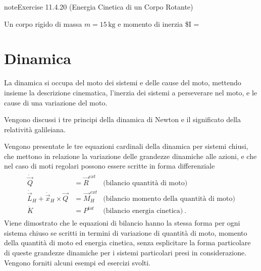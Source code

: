 \documentclass[letterpaper,10pt,italian]{jupyterBook}
\begin{document}
\begin{sphinxadmonition}{note}{Exercise 11.4.20 (Energia Cinetica di un Corpo Rotante)}



\sphinxAtStartPar
Un corpo rigido di massa \(m = 15 \, \text{kg}\) e momento di inerzia \$I =
\end{sphinxadmonition}

\sphinxstepscope




\chapter{Dinamica}
\label{\detokenize{ch/mechanics/dynamics:dinamica}}\label{\detokenize{ch/mechanics/dynamics:physics-hs-mechanics-dynamics}}\label{\detokenize{ch/mechanics/dynamics::doc}}
\sphinxAtStartPar
La dinamica si occupa del moto dei sistemi e delle cause del moto, mettendo insieme la descrizione cinematica, l’inerzia dei sistemi a perseverare nel moto, e le cause di una variazione del moto.

\sphinxAtStartPar
{} Vengono discussi i tre principi della dinamica di Newton e il significato della relatività galileiana.

\sphinxAtStartPar
{} Vengono presentate le tre equazioni cardinali della dinamica per sistemi chiusi, che mettono in relazione la variazione delle grandezze dinamiche alle azioni, e che nel caso di moti regolari possono essere scritte in forma differenziale
\begin{equation*}
\begin{split}\begin{aligned}
 \dot{\vec{Q}} & = \vec{R}^{ext} & \text{(bilancio quantità di moto)} \\
 \dot{\vec{L}}_H + \dot{\vec{x}}_H \times \vec{Q} & = \vec{M}_H^{ext} & \text{(bilancio momento della quantità di moto)} \\
 \dot{K} & = P^{tot} & \text{(bilancio energia cinetica)} \ .
\end{aligned}\end{split}
\end{equation*}
\sphinxAtStartPar
Viene dimostrato che le equazioni di bilancio hanno la stessa forma per ogni sistema chiuso se scritti in termini di variazione di quantità di moto, momento della quantità di moto ed energia cinetica, senza esplicitare la forma particolare di queste grandezze dinamiche per i sistemi particolari presi in considerazione. Vengono forniti alcuni esempi ed esercizi svolti.
\end{document}
